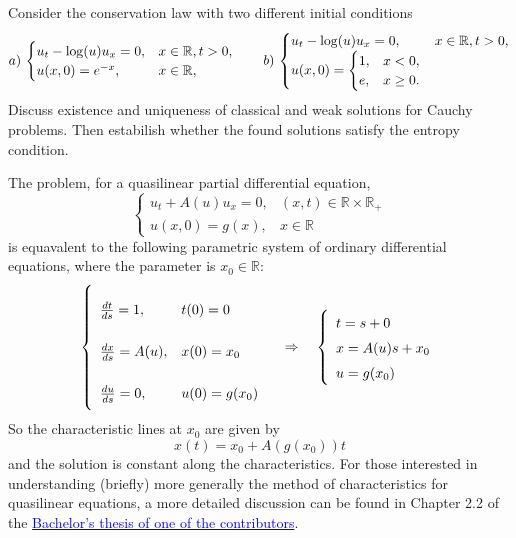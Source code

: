 \newpage
\begin{exercise}
    Consider the conservation law with two different initial conditions
    \begin{equation*}
        a)\,\begin{cases}
            u_t - \log(u) u_x = 0, & x \in \mathbb{R}, t > 0, \\
            u(x,0) = e^{-x},       & x \in \mathbb{R},
        \end{cases}
        \qquad
        b)\,\begin{cases}
            u_t - \log(u) u_x = 0, & x \in \mathbb{R}, t > 0, \\
            u(x,0) = \begin{cases}
                         1, & x < 0,    \\
                         e, & x \geq 0.
                     \end{cases}
        \end{cases}
    \end{equation*}
    Discuss existence and uniqueness of classical and weak solutions for Cauchy problems. Then estabilish whether the found solutions satisfy the entropy condition.
\end{exercise}
\begin{remark}
    The problem, for a quasilinear partial differential equation,
    \[
        \left\{
        \begin{array}{ll}
            u_t + A(u) u_x = 0, & (x, t) \in \mathbb{R} \times \mathbb{R}_+ \\
            u(x, 0) = g(x),     & x \in \mathbb{R}
        \end{array}
        \right.
    \]
    is equavalent to the following parametric system of ordinary differential
    equations, where the parameter is \(x_0 \in \mathbb{R}\):
    \[
        \renewcommand{\arraystretch}{2.5}
        \left\{
        \begin{array}{ll}

            \frac{dt}{ds} = 1,    & t(0) = 0      \\
            \frac{dx}{ds} = A(u), & x(0) = x_0    \\
            \frac{du}{ds} = 0,    & u(0) = g(x_0)
        \end{array}
        \right.
        \quad \Rightarrow \quad
        \renewcommand{\arraystretch}{1.5}
        \left\{
        \begin{array}{l}
            t = s + 0       \\
            x = A(u)s + x_0 \\
            u = g(x_0)
        \end{array}
        \right.
    \]
    So the characteristic lines at \(x_0\) are given by \[x(t) = x_0 + A(g(x_0))t\] and the solution is constant along the characteristics. For those interested in
    understanding (briefly) more generally the method of characteristics for
    quasilinear equations, a more detailed discussion can be found in Chapter 2.2
    of the \href{https://github.com/alessandropedone/cauchy-kowalevski-theorem}
    {\textcolor{blue}{Bachelor's thesis of one of the contributors}}.
\end{remark}

